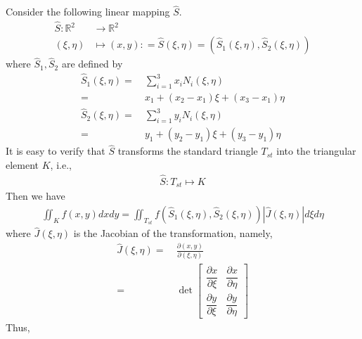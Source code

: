 \documentclass[a4paper]{article}
\numberwithin{equation}{section}
\begin{document}
Consider the following linear mapping $\widehat S$.
\begin{align}
\widehat S:{\mathbb{R}^2} &\to {\mathbb{R}^2}\\
\left( {\xi ,\eta } \right) &\mapsto \left( {x,y} \right): = \widehat S\left( {\xi ,\eta } \right) = \left( {{{\widehat S}_1}\left( {\xi ,\eta } \right),{{\widehat S}_2}\left( {\xi ,\eta } \right)} \right)
\end{align}
where $\widehat{S}_1,\widehat{S}_2$ are defined by
\begin{align}
{\widehat S_1}\left( {\xi ,\eta } \right) =&\ \sum\limits_{i = 1}^3 {{x_i}{N_i}\left( {\xi ,\eta } \right)} \\
 =&\ {x_1} + \left( {{x_2} - {x_1}} \right)\xi  + \left( {{x_3} - {x_1}} \right)\eta \\
{\widehat S_2}\left( {\xi ,\eta } \right) =&\ \sum\limits_{i = 1}^3 {{y_i}{N_i}\left( {\xi ,\eta } \right)} \\
=&\ {y_1} + \left( {{y_2} - {y_1}} \right)\xi  + \left( {{y_3} - {y_1}} \right)\eta 
\end{align}
It is easy to verify that $\widehat{S}$ transforms the standard triangle $T_{st}$ into the triangular element $K$, i.e.,
\begin{align}
\widehat S:{T_{st}} \mapsto K
\end{align}
Then we have
\begin{align}
\label{5.220}
\iint_K {f\left( {x,y} \right)dxdy} = \iint_{{T_{st}}} {f\left( {{{\widehat S}_1}\left( {\xi ,\eta } \right),{{\widehat S}_2}\left( {\xi ,\eta } \right)} \right)\left| {\widehat J\left( {\xi ,\eta } \right)} \right|d\xi d\eta }
\end{align}
where ${\widehat J\left( {\xi ,\eta } \right)}$ is the Jacobian of the transformation, namely,
\begin{align}
\widehat J\left( {\xi ,\eta } \right) =&\ \frac{{\partial \left( {x,y} \right)}}{{\partial \left( {\xi ,\eta } \right)}}\\
=&\ \det \left[ {\begin{array}{*{20}{c}}
{\dfrac{{\partial x}}{{\partial \xi }}}&{\dfrac{{\partial x}}{{\partial \eta }}}\\
{\dfrac{{\partial y}}{{\partial \xi }}}&{\dfrac{{\partial y}}{{\partial \eta }}}
\end{array}} \right]
\end{align}
Thus,
\end{document}
